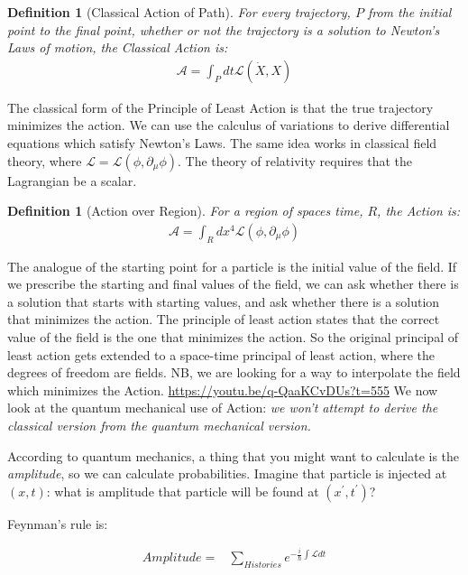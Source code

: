 \documentclass[]{article}
\newtheorem{defn}[thm]{Definition}
\begin{document}
\begin{defn}[Classical Action of Path]
	For every trajectory, $P$ from the initial point to the final point, whether or not the trajectory is a solution to Newton's Laws of motion,  the Classical Action is: 
	\begin{align*}
		\mathcal{A}=\int_P dt \mathcal{L}(\dot{X},X)
	\end{align*}
\end{defn}


The classical form of the Principle of Least Action is that the true trajectory minimizes the action. We can use the calculus of variations to derive differential equations which satisfy Newton's Laws. The same idea works in classical field theory, where $\mathcal{L}=\mathcal{L}(\phi,\partial_\mu\phi)$. The theory of relativity requires that the Lagrangian be a scalar\cite{susskind2017special}.

\begin{defn}[Action over Region]
	For a region of spaces time, $R$,  the Action is: 
	\begin{align*}
		\mathcal{A}=\int_R dx^4 \mathcal{L}(\phi,\partial_\mu\phi)
	\end{align*}
\end{defn}

The analogue of the starting point for a particle is the initial value of the field. If we prescribe the starting and final values of the field, we can ask whether there is a solution that starts with starting values, and ask whether there is a solution that minimizes the action. The principle of least action states that the correct value of the field is the one that minimizes the action. So the original principal of least action gets extended to a space-time principal of least action, where the degrees of freedom are fields. NB, we are looking for a way to interpolate the field which minimizes the Action.
\url{https://youtu.be/q-QaaKCvDUs?t=555}
We now look at the quantum mechanical use of Action: \emph{we won't attempt to derive the classical version from the quantum mechanical version.}

According to quantum mechanics, a thing that you might want to calculate is the \emph{amplitude}, so we can calculate probabilities. Imagine that particle is injected at $(x,t)$: what is amplitude that particle will be found at $(x^\prime,t^\prime)$?

Feynman's rule is:

\begin{align*}
	Amplitude =& \sum_{Histories} e^{-\frac{i}{\hslash} \int \mathcal{L} dt}
\end{align*}
\end{document}
